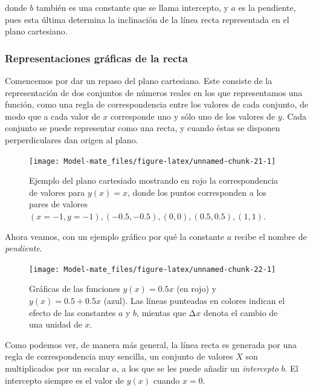 \documentclass[
]{book}
\begin{document}
donde \(b\) también es una constante que se llama intercepto, y \(a\) es la pendiente, pues esta última determina la inclinación de la línea recta representada en el plano cartesiano.

\hypertarget{representaciones-gruxe1ficas-de-la-recta}{%
\subsubsection{Representaciones gráficas de la recta}\label{representaciones-gruxe1ficas-de-la-recta}}

Comencemos por dar un repaso del plano cartesiano. Este consiste de la representación de dos conjuntos de números reales en los que representamos una función, como una regla de correspondencia entre los valores de cada conjunto, de modo que a cada valor de \(x\) corresponde uno y sólo uno de los valores de \(y\). Cada conjunto se puede representar como una recta, y cuando éstas se disponen perperdiculares dan origen al plano.

\begin{figure}

{\centering \texttt{[image: Model-mate\_files/figure-latex/unnamed-chunk-21-1]} 

}

\caption{Ejemplo del plano cartesiado mostrando en rojo la correspondencia de valores para $y(x) = x$, donde los puntos corresponden a los pares de valores $(x = -1, y = -1), (-0.5, -0.5), (0, 0), (0.5, 0.5), (1, 1)$.}\label{fig:unnamed-chunk-21}
\end{figure}

Ahora veamos, con un ejemplo gráfico por qué la constante \(a\) recibe el nombre de \emph{pendiente}.

\begin{figure}

{\centering \texttt{[image: Model-mate\_files/figure-latex/unnamed-chunk-22-1]} 

}

\caption{Gráficas de las funciones $y(x) = 0.5 x$ (en rojo) y $y(x) = 0.5 + 0.5 x$ (azul). Las líneas punteadas en colores indican el efecto de las constantes $a$ y $b$, mientas que Δ$x$ denota el cambio de una unidad de $x$.}\label{fig:unnamed-chunk-22}
\end{figure}

Como podemos ver, de manera más general, la línea recta es generada por una regla de correspondencia muy sencilla, un conjunto de valores \(X\) son multiplicados por un escalar \(a\), a los que se les puede añadir un \emph{intercepto} \(b\). El intercepto siempre es el valor de \(y(x)\) cuando \(x = 0\).
\end{document}
